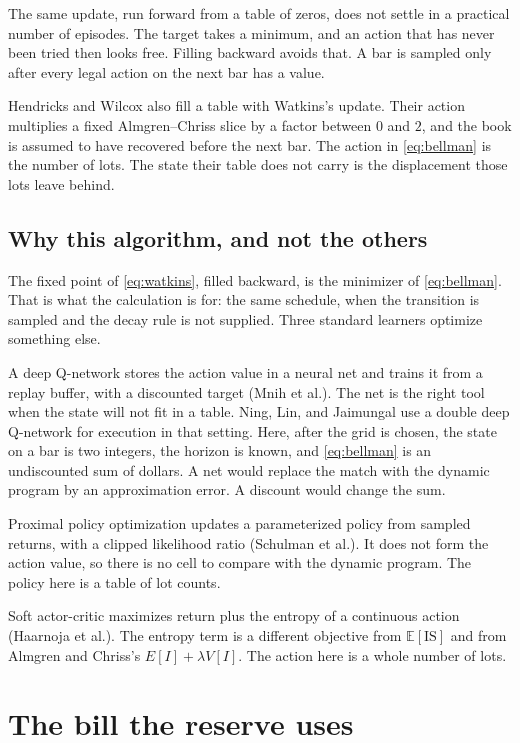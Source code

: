\documentclass[11pt]{article}
\begin{document}
The same update, run forward from a table of zeros, does not settle in a practical number of episodes. The target takes a minimum, and an action that has never been tried then looks free. Filling backward avoids that. A bar is sampled only after every legal action on the next bar has a value.

Hendricks and Wilcox also fill a table with Watkins's update. Their action multiplies a fixed Almgren--Chriss slice by a factor between \(0\) and \(2\), and the book is assumed to have recovered before the next bar. The action in \eqref{eq:bellman} is the number of lots. The state their table does not carry is the displacement those lots leave behind.

\subsection*{Why this algorithm, and not the others}

The fixed point of \eqref{eq:watkins}, filled backward, is the minimizer of \eqref{eq:bellman}. That is what the calculation is for: the same schedule, when the transition is sampled and the decay rule is not supplied. Three standard learners optimize something else.

A deep Q-network stores the action value in a neural net and trains it from a replay buffer, with a discounted target (Mnih et al.). The net is the right tool when the state will not fit in a table. Ning, Lin, and Jaimungal use a double deep Q-network for execution in that setting. Here, after the grid is chosen, the state on a bar is two integers, the horizon is known, and \eqref{eq:bellman} is an undiscounted sum of dollars. A net would replace the match with the dynamic program by an approximation error. A discount would change the sum.

Proximal policy optimization updates a parameterized policy from sampled returns, with a clipped likelihood ratio (Schulman et al.). It does not form the action value, so there is no cell to compare with the dynamic program. The policy here is a table of lot counts.

Soft actor-critic maximizes return plus the entropy of a continuous action (Haarnoja et al.). The entropy term is a different objective from \(\mathbb{E}[\mathrm{IS}]\) and from Almgren and Chriss's \(E[I]+\lambda V[I]\). The action here is a whole number of lots.

\section{The bill the reserve uses}
\label{sec:kappa}
\end{document}
